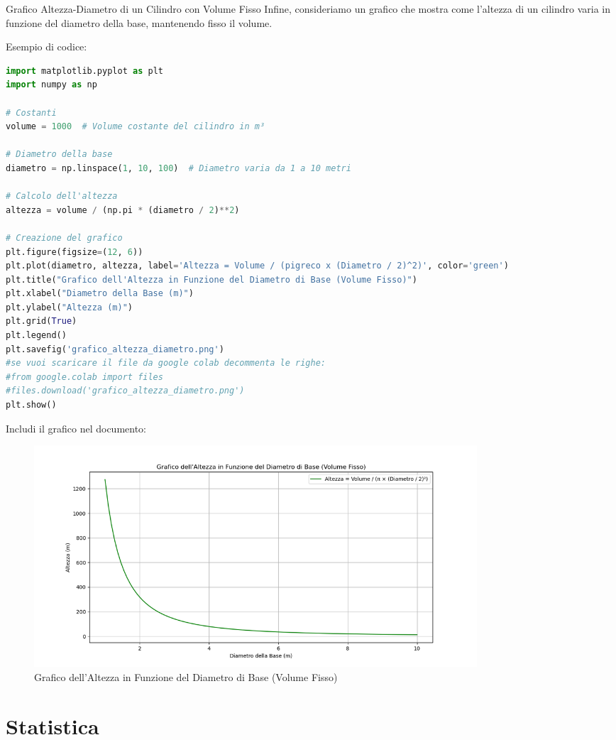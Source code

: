 \documentclass[12pt,a4paper,oneside]{book}
\makeatletter
\renewcommand{\subsection}{\@startsection {subsection}{2}{\z@}
{-3ex \@plus -0.1ex \@minus -.4ex}
{0.5ex \@plus.2ex }
{\color[rgb]{0.141,0.596,0.749}\normalfont\sffamily\bfseries}}
\theoremstyle{esercizio}
\makeatother
\begin{document}
\subsection{Grafico Altezza-Diametro di un Cilindro con Volume Fisso}
Infine, consideriamo un grafico che mostra come l'altezza di un cilindro varia in funzione del diametro della base, mantenendo fisso il volume.

Esempio di codice:
\begin{lstlisting}[language=Python]
import matplotlib.pyplot as plt
import numpy as np

# Costanti
volume = 1000  # Volume costante del cilindro in m³

# Diametro della base
diametro = np.linspace(1, 10, 100)  # Diametro varia da 1 a 10 metri

# Calcolo dell'altezza
altezza = volume / (np.pi * (diametro / 2)**2)

# Creazione del grafico
plt.figure(figsize=(12, 6))
plt.plot(diametro, altezza, label='Altezza = Volume / (pigreco x (Diametro / 2)^2)', color='green')
plt.title("Grafico dell'Altezza in Funzione del Diametro di Base (Volume Fisso)")
plt.xlabel("Diametro della Base (m)")
plt.ylabel("Altezza (m)")
plt.grid(True)
plt.legend()
plt.savefig('grafico_altezza_diametro.png')
#se vuoi scaricare il file da google colab decommenta le righe:
#from google.colab import files
#files.download('grafico_altezza_diametro.png')
plt.show()
\end{lstlisting}

Includi il grafico nel documento:
\begin{figure}[h!]
    \centering
    \includegraphics[width=0.8\textwidth]{img/grafico_altezza_diametro.png}
    \caption{Grafico dell'Altezza in Funzione del Diametro di Base (Volume Fisso)}
    \label{fig:altezza_diametro}
\end{figure}
\chapter{Statistica}
\end{document}
